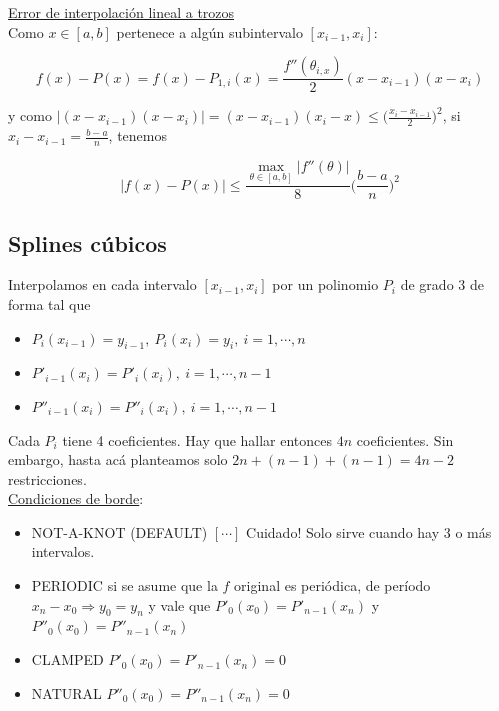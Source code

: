 \underline{Error de interpolaci\'on lineal a trozos}\\

Como $x \in [a, b]$ pertenece a alg\'un subintervalo $[x_{i - 1}, x_{i}]$:

$$f(x) - P(x) = f(x) - P_{1, i}(x) = \frac{f''(\theta_{i, x})}{2}(x - x_{i - 1})(x - x_{i})$$

y como $|(x - x_{i - 1})(x - x_{i})| = (x - x_{i - 1})(x_{i} - x) \leq \bigg(\frac{x_{i} - x_{i - 1}}{2}\bigg)^{2}$, si $x_{i} - x_{i - 1} = \frac{b - a}{n}$, tenemos

$$|f(x) - P(x)| \leq \frac{\max \limits_{\theta \in [a, b]} |f''(\theta)|}{8}\bigg(\frac{b - a}{n}\bigg)^{2}$$

\subsection{Splines c\'ubicos}

Interpolamos en cada intervalo $[x_{i - 1}, x_{i}]$ por un polinomio $P_{i}$ de grado 3 de forma tal que

\begin{itemize}
	\item $P_{i}(x_{i - 1}) = y_{i - 1},\ P_{i}(x_{i}) = y_{i},\ i = 1, \cdots, n$
	\item $P'_{i - 1}(x_{i}) = P'_{i}(x_{i}),\ i = 1, \cdots, n - 1$
	\item $P''_{i - 1}(x_{i}) = P''_{i}(x_{i}),\ i = 1, \cdots, n - 1$
\end{itemize}

Cada $P_{i}$ tiene 4 coeficientes. Hay que hallar entonces $4n$ coeficientes. Sin embargo, hasta ac\'a planteamos solo $2n + (n - 1) + (n - 1) = 4n - 2$ restricciones.\\

\underline{Condiciones de borde}:

\begin{itemize}
	\item NOT-A-KNOT (DEFAULT) $[\cdots]$ Cuidado! Solo sirve cuando hay 3 o m\'as intervalos.\\
	\item PERIODIC si se asume que la $f$ original es peri\'odica, de per\'iodo $x_{n} - x_{0} \Rightarrow y_{0} = y_{n}$ y vale que $P'_{0}(x_{0}) = P'_{n - 1}(x_{n})$ y $P''_{0}(x_{0}) = P''_{n - 1}(x_{n})$\\
	\item CLAMPED $P'_{0}(x_{0}) = P'_{n - 1}(x_{n}) = 0$\\
	\item NATURAL $P''_{0}(x_{0}) = P''_{n - 1}(x_{n}) = 0$\\
\end{itemize}

